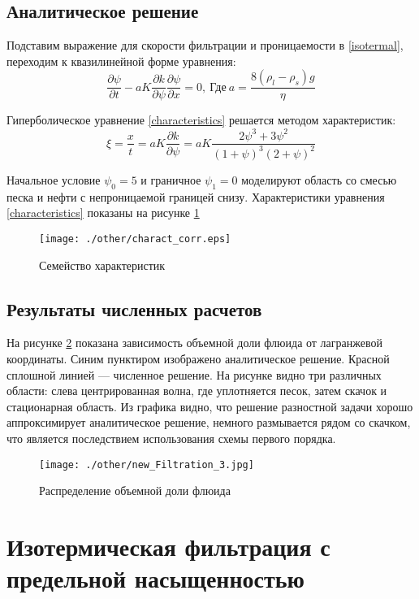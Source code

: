 \documentclass[12pt,a4paper]{article}
\newcommand{\pd}[2]{\frac{\partial #1}{\partial #2}}
\begin{document}
\subsection{Аналитическое решение}
Подставим выражение для скорости фильтрации и проницаемости в \eqref{isotermal}, переходим к квазилинейной форме уравнения:
\begin{equation}
\pd{\psi}{t} - a K \pd{k}{\psi} \pd{\psi}{x} = 0,\  \text{Где}\ a = \frac{8(\rho_l-\rho_s)g}{\eta}
\label{characteristics}
\end{equation}

Гиперболическое уравнение \eqref{characteristics} решается методом характеристик:
$$
\xi = \frac{x}{t} = a K \pd{k}{\psi} =   a K \frac{2\psi^3 + 3\psi^2}{(1 + \psi)^3(2+\psi)^2}
$$

Начальное условие $\psi_0 = 5$ и граничное $\psi_1 = 0$ моделируют область со смесью песка и нефти с непроницаемой границей снизу. Характеристики уравнения \eqref{characteristics} показаны на рисунке \ref{charact}
\begin{figure}[ht!]
\begin{center}
\texttt{[image: ./other/charact\_corr.eps]}
\caption{Семейство характеристик}
\label{charact}
\end{center}
\end{figure}

\subsection{Результаты численных расчетов}
На рисунке \ref{vol_fraction} показана зависимость объемной доли флюида от лагранжевой координаты. Синим пунктиром изображено аналитическое решение. Красной сплошной линией --- численное решение. На рисунке видно три различных области: слева центрированная волна, где уплотняется песок, затем скачок и стационарная область. Из графика видно, что решение разностной задачи хорошо аппроксимирует аналитическое решение, немного размывается рядом со скачком, что является последствием использования схемы первого порядка.
\begin{figure}[h!]
\begin{center}
\texttt{[image: ./other/new\_Filtration\_3.jpg]}
\caption{Распределение объемной доли флюида}
\label{vol_fraction}
\end{center}
\end{figure}
\newpage
\section{Изотермическая фильтрация с предельной насыщенностью}
\end{document}
